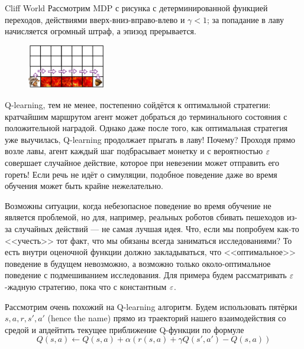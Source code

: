 \begin{exampleBox}[label=ex:cliffworld]{Cliff World}
Рассмотрим MDP с рисунка с детерминированной функцией переходов, действиями вверх-вниз-вправо-влево и $\gamma < 1$; за попадание в лаву начисляется огромный штраф, а эпизод прерывается.

\begin{figure}
\centering
\includegraphics[width=0.3\textwidth]{Images/SafeRL1.png}
\end{figure}
Q-learning, тем не менее, постепенно сойдётся к оптимальной стратегии: кратчайшим маршрутом агент может добраться до терминального состояния с положительной наградой. Однако даже после того, как оптимальная стратегия уже выучилась, Q-learning продолжает прыгать в лаву! Почему? Проходя прямо возле лавы, агент каждый шаг подбрасывает монетку и с вероятностью $\varepsilon$ совершает случайное действие, которое при невезении может отправить его гореть! Если речь не идёт о симуляции, подобное поведение даже во время обучения может быть крайне нежелательно.
\end{exampleBox}

Возможны ситуации, когда небезопасное поведение во время обучение не является проблемой, но для, например, реальных роботов сбивать пешеходов из-за случайных действий --- не самая лучшая идея. Что, если мы попробуем как-то <<учесть>> тот факт, что мы обязаны всегда заниматься исследованиями? То есть внутри оценочной функции должно закладываться, что <<оптимальное>> поведение в будущем невозможно, а возможно только около-оптимальное поведение с подмешиванием исследования. Для примера будем рассматривать $\varepsilon$-жадную стратегию, пока что с константным $\varepsilon$.

Рассмотрим очень похожий на Q-learning алгоритм. Будем использовать пятёрки $s, a, r, s', a'$ (hence the name) прямо из траекторий нашего взаимодействия со средой и апдейтить текущее приближение Q-функции по формуле
\begin{equation}\label{sarsa}
Q(s, a) \leftarrow Q(s, a) + \alpha \left( r(s, a) + \gamma Q(s', a') - Q(s, a) \right)
\end{equation}

